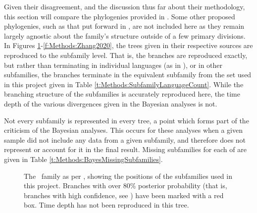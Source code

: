 Given their disagreement, and the discussion thus far about their methodology, this section will compare the phylogenies provided in . Some other proposed phylogenies, such as that put forward in , are not included here as they remain largely agnostic about the family's structure outside of a few primary divisions. In Figures \ref{f:Methods:Sagart}-\ref{f:Methods:Zhang2020}, the trees given in their respective sources are reproduced to the subfamily level. That is, the branches are reproduced exactly, but rather than terminating in individual languages (as in ), or in other subfamilies, the branches terminate in the equivalent subfamily from the set used in this project given in Table \ref{t:Methods:SubfamilyLanguageCount}. While the branching structure of the subfamilies is accurately reproduced here, the time depth of the various divergences given in the Bayesian analyses is not.

Not every subfamily is represented in every tree, a point which forms part of the criticism of the Bayesian analyses. This occurs for these analyses when a given sample did not include any data from a given subfamily, and therefore does not represent or account for it in the final result. Missing subfamilies for each of  are given in Table \ref{t:Methods:BayesMissingSubfamilies}.

\begin{figure}
\centering
\label{f:Methods:Sagart}
\caption{The \lfam\ family as per , showing the positions of the subfamilies used in this project. Branches with over 80\% posterior probability (that is, branches with high confidence, see ) have been marked with a red box. Time depth has not been reproduced in this tree.}
\end{figure}

